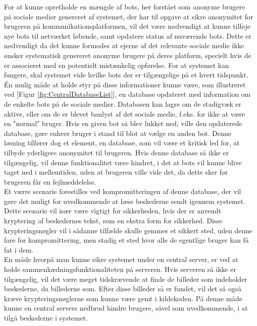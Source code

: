 For at kunne opretholde en mængde af bots, her forstået som anonyme brugere på sociale medier genereret af systemet, der har til opgave at sikre anonymitet for brugeren på kommunikationsplatformen, vil det være nødvendigt at kunne tilføje nye bots til netværket løbende, samt opdatere status af nuværende bots. Dette er nødvendigt da det kunne formodes at ejerne af det relevante sociale medie ikke ønsker systematisk genereret anonyme brugere på deres platform, specielt hvis de er associeret med en potentielt mistænkelig opførelse. 
% 
For at systemet kan fungere, skal systemet vide hvilke bots der er tilgængelige på et hvert tidspunkt. Én mulig måde at holde styr på disse informationer kunne være, som illustreret ved [Figur \ref{fig:CentralDatabaseList}], en database opdateret med information om de enkelte bots på de sociale medier. Databasen kan lagre om de stadigvæk er aktive, eller om de er blevet banlyst af det sociale medie, f.eks. for ikke at være en "normal" bruger. Hvis en given bot så blev lukket ned, ville den opdaterede database, gøre enhver bruger i stand til blot at vælge en anden bot. Denne løsning tilfører dog et element, en database, som vil være et kritisk led for, at tilbyde yderligere anonymitet til brugeren. Hvis denne database så ikke er tilgængelig, vil denne funktionalitet være hindret, i det at bots vil kunne blive taget ned i mellemtiden, uden at brugeren ville vide det, da dette sker før brugeren får en fejlmeddelelse.\\ 
Et værre scenarie forestilles ved kompromitteringen af denne database, der vil gøre det muligt for uvedkommende at læse beskederne sendt igennem systemet. Dette scenarie vil især være vigtigt for sikkerheden, hvis der er anvendt kryptering af beskedernes tekst, som en ekstra form for sikkerhed. Disse krypteringsnøgler vil i sådanne tilfælde skulle gemmes et sikkert sted, uden denne fare for kompromittering, men stadig et sted hvor alle de egentlige bruger kan få fat i dem.\\ 
En måde hvorpå man kunne sikre systemet under en central server, er ved at holde sammenkædningsfunktionaliteten på serveren. Hvis serveren så ikke er tilgængelig, vil det være meget tidskrævende at finde de billeder som indeholder beskederne, da billederne som. Efter disse billeder så er fundet, vil det så også kræve krypteringsnøglerne som kunne være gemt i kildekoden. På denne måde kunne en central servers nedbrud hindre brugere, såvel som uvedkommende, i at tilgå beskederne i systemet.

